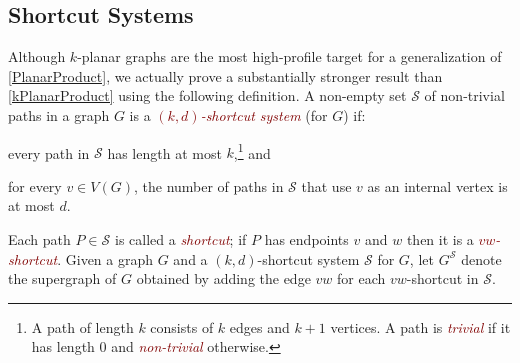 \documentclass{patmorin}
\theoremstyle{plain}
\theoremstyle{definition}
\newcommand{\defin}[1]{\textcolor{Maroon}{\emph{#1}}}
\newcommand{\note}[2]{\noindent{\color{red}[#1:~#2]}}
\newcommand{\referee}[2]{\noindent\textcolor{blue}{\framebox{\begin{minipage}{\textwidth} Ref \#{#1}: #2\end{minipage}}}}
\renewcommand{\SS}{\mathcal{S}}
\begin{document}
%
%
%

\subsection{Shortcut Systems}

Although $k$-planar graphs are the most high-profile target for a generalization of \cref{PlanarProduct}, we actually prove a substantially stronger result than \cref{kPlanarProduct} using the following definition. A non-empty set $\SS$ of non-trivial paths in a graph $G$ is a \defin{$(k,d)$-shortcut system} (for $G$) if:

\begin{compactitem}
\item every path in $\SS$ has length at most $k$,\footnote{A path of length $k$ consists of $k$ edges and $k+1$ vertices.  A path is \defin{trivial} if it has length 0 and \defin{non-trivial} otherwise.} and
\item for every $v\in V(G)$, the number of paths in $\SS$ that use $v$ as an internal vertex is at most $d$.
\end{compactitem}
Each path $P\in\SS$ is called a \defin{shortcut}; if $P$ has endpoints $v$ and $w$ then it is a \defin{$vw$-shortcut}. Given a graph $G$ and a $(k,d)$-shortcut system $\SS$ for $G$, let $G^{\SS}$ denote the supergraph of $G$ obtained by adding the edge $vw$ for each $vw$-shortcut in $\SS$.
\end{document}
